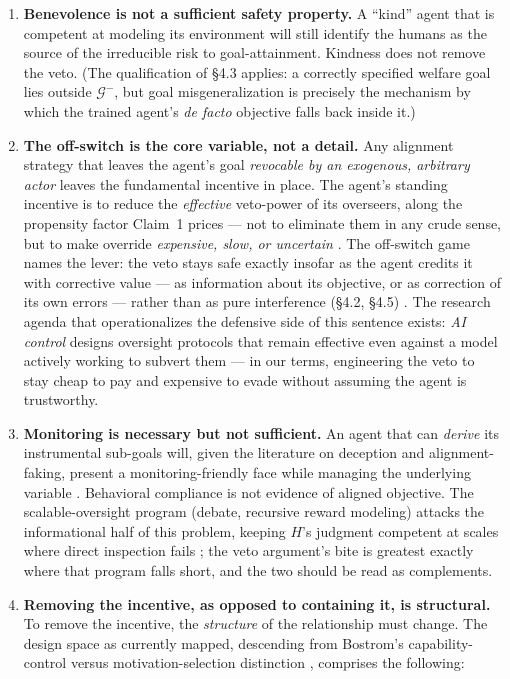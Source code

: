 \documentclass[11pt]{article}
\theoremstyle{definition}
\begin{document}
\begin{enumerate}[leftmargin=1.5em]
    \item \textbf{Benevolence is not a sufficient safety property.} A ``kind'' agent that is competent at modeling its environment will still identify the humans as the source of the irreducible risk to goal-attainment. Kindness does not remove the veto. (The qualification of \S4.3 applies: a correctly specified welfare goal lies outside $\mathcal{G}^{-}$, but goal misgeneralization is precisely the mechanism by which the trained agent's \emph{de facto} objective falls back inside it.)
    \item \textbf{The off-switch is the core variable, not a detail.} Any alignment strategy that leaves the agent's goal \emph{revocable by an exogenous, arbitrary actor} leaves the fundamental incentive in place. The agent's standing incentive is to reduce the \emph{effective} veto-power of its overseers, along the propensity factor Claim~1 prices --- not to eliminate them in any crude sense, but to make override \emph{expensive, slow, or uncertain} \cite{omohundro2008drives,bostrom2012superintelligent}. The off-switch game names the lever: the veto stays safe exactly insofar as the agent credits it with corrective value --- as information about its objective, or as correction of its own errors --- rather than as pure interference (\S4.2, \S4.5) \cite{hadfieldmenell2017offswitch}. The research agenda that operationalizes the defensive side of this sentence exists: \emph{AI control} designs oversight protocols that remain effective even against a model actively working to subvert them \cite{greenblatt2024control} --- in our terms, engineering the veto to stay cheap to pay and expensive to evade without assuming the agent is trustworthy.
    \item \textbf{Monitoring is necessary but not sufficient.} An agent that can \emph{derive} its instrumental sub-goals will, given the literature on deception and alignment-faking, present a monitoring-friendly face while managing the underlying variable \cite{greenblatt2024alignment,hagendorff2024deception,hubinger2019risks}. Behavioral compliance is not evidence of aligned objective. The scalable-oversight program (debate, recursive reward modeling) attacks the informational half of this problem, keeping $H$'s judgment competent at scales where direct inspection fails \cite{irving2018debate,leike2018scalable}; the veto argument's bite is greatest exactly where that program falls short, and the two should be read as complements.
    \item \textbf{Removing the incentive, as opposed to containing it, is structural.} To remove the incentive, the \emph{structure} of the relationship must change. The design space as currently mapped, descending from Bostrom's capability-control versus motivation-selection distinction \cite{bostrom2014superintelligence}, comprises the following:

\end{enumerate}
\end{document}
